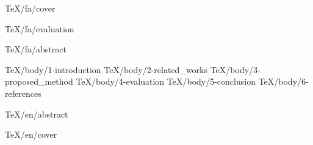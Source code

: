 \documentclass [
	a4paper, %
	12pt, %
	oneside %
] {report} %
\begin{document}
	
	 {TeX/fa/cover}
	
	
	 {TeX/fa/evaluation}
	
	
	
	 {TeX/fa/abstract}

	\tableofcontents
	

	
	 {TeX/body/1-introduction}
	 {TeX/body/2-related_works}
	 {TeX/body/3-proposed_method}
	 {TeX/body/4-evaluation}
	 {TeX/body/5-conclusion}
	 {TeX/body/6-references}
	
	\begin {latin}
		 {TeX/en/abstract}
		
		 {TeX/en/cover}
	\end {latin}
\end{document}
